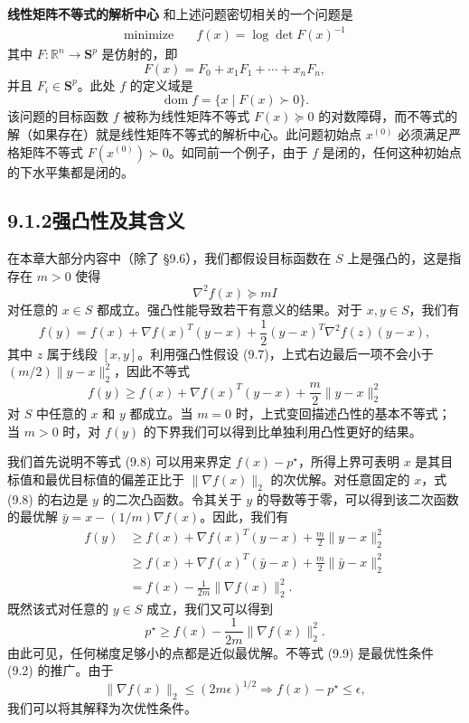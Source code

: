 \documentclass[UTF8,12pt,a4paper,fontset=fandol]{ctexart}
\begin{document}
\noindent\textbf{线性矩阵不等式的解析中心}\quad
和上述问题密切相关的一个问题是
\begin{equation}
\begin{aligned}
\text{minimize}\quad & f(x)=\log\det F(x)^{-1}
\end{aligned}
\tag{9.6}
\end{equation}
其中 $F:\mathbb{R}^n\to\mathbf{S}^p$ 是仿射的，即
\[
F(x)=F_0+x_1F_1+\cdots+x_nF_n,
\]
并且 $F_i\in\mathbf{S}^p$。此处 $f$ 的定义域是
\[
\operatorname{dom} f=\{x\mid F(x)\succ0\}.
\]
该问题的目标函数 $f$ 被称为线性矩阵不等式 $F(x)\succeq0$ 的对数障碍，而不等式的解（如果存在）就是线性矩阵不等式的解析中心。此问题初始点 $x^{(0)}$ 必须满足严格矩阵不等式 $F(x^{(0)})\succ0$。如同前一个例子，由于 $f$ 是闭的，任何这种初始点的下水平集都是闭的。

\subsection*{9.1.2\quad 强凸性及其含义}

在本章大部分内容中（除了 \S9.6），我们都假设目标函数在 $S$ 上是强凸的，这是指存在 $m>0$ 使得
\begin{equation}
\nabla^2 f(x)\succeq mI
\tag{9.7}
\end{equation}
对任意的 $x\in S$ 都成立。强凸性能导致若干有意义的结果。对于 $x,y\in S$，我们有
\[
f(y)=f(x)+\nabla f(x)^T(y-x)+\frac{1}{2}(y-x)^T\nabla^2 f(z)(y-x),
\]
其中 $z$ 属于线段 $[x,y]$。利用强凸性假设 (9.7)，上式右边最后一项不会小于 $(m/2)\|y-x\|_2^2$，因此不等式
\begin{equation}
f(y)\geq f(x)+\nabla f(x)^T(y-x)+\frac{m}{2}\|y-x\|_2^2
\tag{9.8}
\end{equation}
对 $S$ 中任意的 $x$ 和 $y$ 都成立。当 $m=0$ 时，上式变回描述凸性的基本不等式；当 $m>0$ 时，对 $f(y)$ 的下界我们可以得到比单独利用凸性更好的结果。

我们首先说明不等式 (9.8) 可以用来界定 $f(x)-p^\star$，所得上界可表明 $x$ 是其目标值和最优目标值的偏差正比于 $\|\nabla f(x)\|_2$ 的次优解。对任意固定的 $x$，式 (9.8) 的右边是 $y$ 的二次凸函数。令其关于 $y$ 的导数等于零，可以得到该二次函数的最优解 $\bar{y}=x-(1/m)\nabla f(x)$。因此，我们有
\[
\begin{aligned}
f(y)&\geq f(x)+\nabla f(x)^T(y-x)+\frac{m}{2}\|y-x\|_2^2\\
&\geq f(x)+\nabla f(x)^T(\bar{y}-x)+\frac{m}{2}\|\bar{y}-x\|_2^2\\
&=f(x)-\frac{1}{2m}\|\nabla f(x)\|_2^2.
\end{aligned}
\]
既然该式对任意的 $y\in S$ 成立，我们又可以得到
\begin{equation}
p^\star\geq f(x)-\frac{1}{2m}\|\nabla f(x)\|_2^2.
\tag{9.9}
\end{equation}
由此可见，任何梯度足够小的点都是近似最优解。不等式 (9.9) 是最优性条件 (9.2) 的推广。由于
\begin{equation}
\|\nabla f(x)\|_2\leq(2m\epsilon)^{1/2}\Longrightarrow f(x)-p^\star\leq\epsilon,
\tag{9.10}
\end{equation}
我们可以将其解释为次优性条件。
\end{document}
